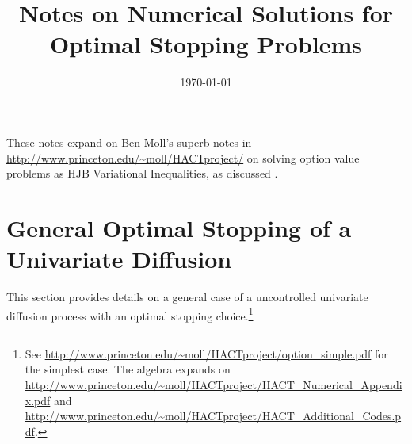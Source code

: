 \documentclass[11pt]{etk-article}
\begin{document}
\title{Notes on Numerical Solutions for Optimal Stopping Problems}
\date{\today}
\maketitle
These notes expand on Ben Moll's superb notes in \url{http://www.princeton.edu/~moll/HACTproject/} on solving option value problems as HJB Variational Inequalities, as discussed \cite{HuangPang1998}.
%
\section{General Optimal Stopping of a Univariate Diffusion}
This section provides details on a general case of a uncontrolled univariate diffusion process with an optimal stopping choice.\footnote{See \url{http://www.princeton.edu/~moll/HACTproject/option_simple.pdf} for the simplest case.  The algebra expands on \url{http://www.princeton.edu/~moll/HACTproject/HACT_Numerical_Appendix.pdf} and \url{http://www.princeton.edu/~moll/HACTproject/HACT_Additional_Codes.pdf}.}
\end{document}
